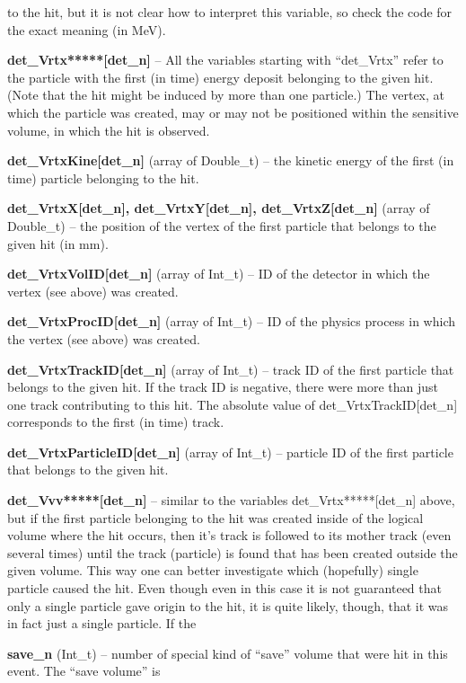 \documentclass[twoside]{dis04}
\begin{document}
\begin{description}
	to the hit, but it is not clear how to interpret this variable, so check the
	code for the exact meaning (in MeV).
\item{\bf det\_Vrtx*****[det\_n]} -- All the variables starting with ``det\_Vrtx'' refer to the particle with the first (in time) energy deposit
         belonging to the given hit.  (Note that the hit might be induced by more than one particle.)  The vertex, at which
         the particle was created, may or may not be positioned within the sensitive volume, in which the hit is observed.
\item{\bf det\_VrtxKine[det\_n]} (array of Double\_t) -- the kinetic energy of the first (in time) particle belonging to the hit.
\item{\bf det\_VrtxX[det\_n], det\_VrtxY[det\_n], det\_VrtxZ[det\_n]}  (array of Double\_t) -- the position of the vertex of
	the first particle that belongs to the given hit (in mm). 
\item{\bf det\_VrtxVolID[det\_n]} (array of Int\_t) -- ID of the detector in which the vertex (see above) was created.
\item{\bf det\_VrtxProcID[det\_n]} (array of Int\_t) -- ID of the physics process in which the vertex (see above) was created.
\item{\bf det\_VrtxTrackID[det\_n]} (array of Int\_t) -- track ID of the first particle that belongs to the given hit.
	If the track ID is negative, there were more than just one track contributing to this hit.  The absolute value
        of det\_VrtxTrackID[det\_n] corresponds to the first (in time) track.
\item{\bf det\_VrtxParticleID[det\_n]} (array of Int\_t) -- particle ID of the first particle that belongs to the given hit.
\item{\bf det\_Vvv*****[det\_n]} -- similar to the variables det\_Vrtx*****[det\_n] above, but if the first particle 
	belonging to the hit was created inside of the logical volume where the hit occurs, then it's track is followed
        to its mother track (even several times) until the track (particle) is found that has been created outside the
        given volume.  This way one can better investigate which (hopefully) single particle caused the hit.  Even though
        even in this case it is not guaranteed that only a single particle gave origin to the hit, it is quite likely, though, 
	that it was in fact just a single particle.  If the 
\item{\bf save\_n} (Int\_t) -- number of special kind of ``save'' volume that were hit in this event. The ``save volume'' is

\end{description}
\end{document}
